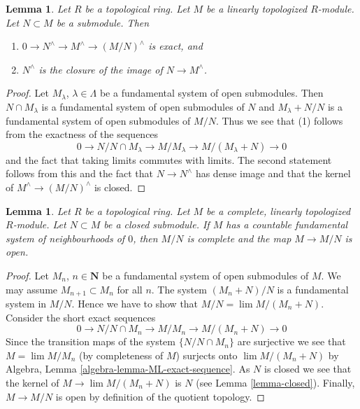 \documentclass{stacks-project}
\theoremstyle{plain}
\newtheorem{lemma}[subsection]{Lemma}
\theoremstyle{definition}
\theoremstyle{remark}
\numberwithin{equation}{subsection}
\def\lim{\mathop{\mathrm{lim}}\nolimits}
\begin{document}
\begin{lemma}
\label{lemma-closure}
Let $R$ be a topological ring. Let $M$ be a linearly topologized
$R$-module. Let $N \subset M$ be a submodule. Then
\begin{enumerate}
\item $0 \to N^\wedge \to M^\wedge \to (M/N)^\wedge$ is exact, and
\item $N^\wedge$ is the closure of the image of $N \to M^\wedge$.
\end{enumerate}
\end{lemma}

\begin{proof}
Let $M_\lambda$, $\lambda \in \Lambda$ be a fundamental system of
open submodules. Then $N \cap M_\lambda$ is a fundamental system
of open submodules of $N$ and $M_\lambda + N/N$ is a fundamental system
of open submodules of $M/N$. Thus we see that (1) follows from
the exactness of the sequences
$$
0 \to N/N \cap M_\lambda \to M/M_\lambda \to M/(M_\lambda + N) \to 0
$$
and the fact that taking limits commutes with limits. The second
statement follows from this and the fact that $N \to N^\wedge$
has dense image and that the kernel of $M^\wedge \to (M/N)^\wedge$ is closed.
\end{proof}

\begin{lemma}
\label{lemma-quotient-by-closed}
Let $R$ be a topological ring. Let $M$ be a complete, linearly topologized
$R$-module. Let $N \subset M$ be a closed submodule. If $M$ has a
countable fundamental system of neighbourhoods of $0$, then
$M/N$ is complete and the map $M \to M/N$ is open.
\end{lemma}

\begin{proof}
Let $M_n$, $n \in \mathbf{N}$ be a fundamental system of open submodules of $M$.
We may assume $M_{n + 1} \subset M_n$
for all $n$. The system $(M_n + N)/N$ is a fundamental system in $M/N$.
Hence we have to show that $M/N = \lim M/(M_n + N)$. Consider
the short exact sequences
$$
0 \to N/N \cap M_n \to M/M_n \to M/(M_n + N) \to 0
$$
Since the transition maps of the system $\{N/N\cap M_n\}$ are surjective
we see that $M = \lim M/M_n$ (by completeness of $M$) surjects onto
$\lim M/(M_n + N)$ by
Algebra, Lemma \ref{algebra-lemma-ML-exact-sequence}.
As $N$ is closed we see that the kernel of $M \to \lim M/(M_n + N)$
is $N$ (see Lemma \ref{lemma-closed}). Finally, $M \to M/N$
is open by definition of the quotient topology.
\end{proof}
\end{document}
